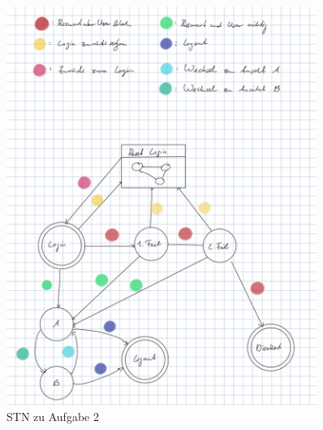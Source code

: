 \graphicspath{ {../images/} } 

\begin{figure}[h!]
  \caption{STN zu Aufgabe 2}
  \centering
  \includegraphics[width=0.9\textwidth]{STN}
\end{figure}

